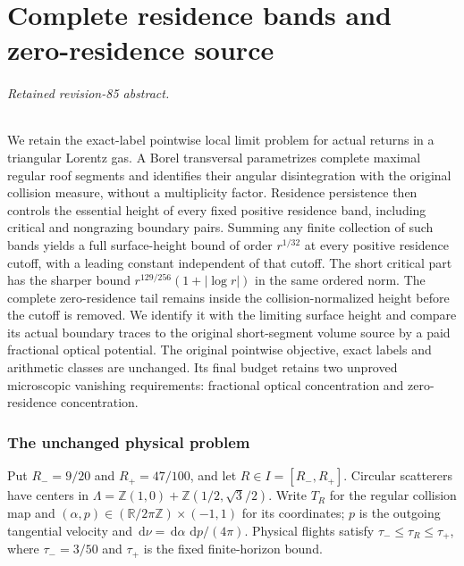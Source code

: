 \documentclass[11pt,reqno]{amsart}
\numberwithin{equation}{section}
\theoremstyle{definition}\newtheorem{definition}[theorem]{Definition}
\theoremstyle{remark}\newtheorem{remark}[theorem]{Remark}
\newcommand{\R}{\mathbb R}\newcommand{\Z}{\mathbb Z}\newcommand{\T}{\mathbb T}
\newcommand{\dd}{\,\mathrm d}\newcommand{\one}{\mathbf1}
\theoremstyle{definition}\newtheorem{inputstatement}[theorem]{Input statement}
\begin{document}
\appendix


\endgroup
\part{Complete residence bands and zero-residence source}
\begingroup
\let\ArchiveLabel\label
\let\ArchiveRef\ref
\renewcommand{\label}[1]{\ArchiveLabel{v85archive:#1}}
\renewcommand{\ref}[1]{%
  \IfBeginWith{#1}{supp-}{%
    \StrBehind{#1}{supp-}[\ArchiveTarget]%
    \ArchiveRef{\ArchiveTarget}%
  }{\ArchiveRef{v85archive:#1}}%
}
\makeatletter
\let\ltx@label\label
\makeatother
\let\ArchivePageRef\pageref
\renewcommand{\pageref}[1]{%
  \IfBeginWith{#1}{supp-}{%
    \StrBehind{#1}{supp-}[\ArchivePageTarget]%
    \ArchivePageRef{\ArchivePageTarget}%
  }{\ArchivePageRef{v85archive:#1}}%
}
\paragraph{Retained revision-85 abstract.}

We retain the exact-label pointwise local limit problem for actual returns
in a triangular Lorentz gas. A Borel transversal parametrizes complete
maximal regular roof segments and identifies their angular disintegration
with the original collision measure, without a multiplicity factor.
Residence persistence then controls the essential height of every fixed
positive residence band, including critical and nongrazing boundary pairs.
Summing any finite collection of such bands yields a full surface-height
bound of order $r^{1/32}$ at every positive residence cutoff, with a leading
constant independent of that cutoff. The short critical part has the
sharper bound $r^{129/256}(1+|\log r|)$ in the same ordered norm.
The complete zero-residence tail remains inside the collision-normalized
height before the cutoff is removed. We identify it with the limiting
surface height and compare its actual boundary traces to the original
short-segment volume source by a paid fractional optical potential.
The original pointwise objective, exact labels and arithmetic classes
are unchanged. Its final budget retains two unproved microscopic
vanishing requirements: fractional optical concentration and
zero-residence concentration.



\section{The unchanged physical problem}
Put $R_-=9/20$ and $R_+=47/100$, and let $R\in I=[R_-,R_+]$. Circular scatterers have centers in
$\Lambda=\Z(1,0)+\Z(1/2,\sqrt3/2)$. Write $T_R$ for the regular
collision map and $(\alpha,p)\in(\R/2\pi\Z)\times(-1,1)$ for its
coordinates; $p$ is the outgoing tangential velocity and
$\dd\nu=\dd\alpha\,\dd p/(4\pi)$. Physical flights satisfy
$\tau_-\le\tau_R\le\tau_+$, where $\tau_-=3/50$ and $\tau_+$
is the fixed finite-horizon bound.
\end{document}
